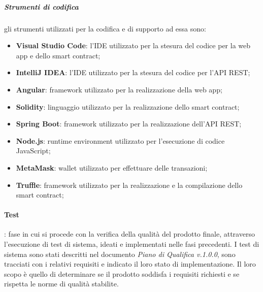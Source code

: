\subparagraph{Strumenti di codifica} gli strumenti utilizzati per la codifica e di supporto ad essa sono:
\begin{itemize}
    \item \textbf{Visual Studio Code}: l'IDE utilizzato per la stesura del codice per la web app e dello smart contract;
    \item \textbf{IntelliJ IDEA}: l'IDE utilizzato per la stesura del codice per l'API REST;
    \item \textbf{Angular}: framework utilizzato per la realizzazione della web app;
    \item \textbf{Solidity}: linguaggio utilizzato per la realizzazione dello smart contract;
    \item \textbf{Spring Boot}: framework utilizzato per la realizzazione dell'API REST;
    \item \textbf{Node.js}: runtime environment utilizzato per l'esecuzione di codice JavaScript;
    \item \textbf{MetaMask}: wallet utilizzato per effettuare delle transazioni;
    \item \textbf{Truffle}: framework utilizzato per la realizzazione e la compilazione dello smart contract;
\end{itemize}

\paragraph{Test}: fase in cui si procede con la verifica della qualità del prodotto finale, attraverso l'esecuzione di test di sistema, ideati e implementati nelle fasi precedenti. \newline
I test di sistema sono stati descritti nel documento \textit{Piano di Qualifica v.1.0.0}, sono tracciati con i relativi requisiti e indicato il loro stato di implementazione. \newline
Il loro scopo è quello di determinare se il prodotto soddisfa i requisiti richiesti e se rispetta le norme di qualità stabilite.

